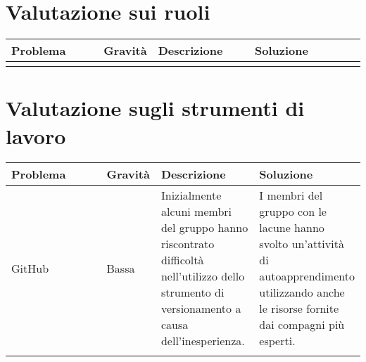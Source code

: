 \section{Valutazione sui ruoli}
\begin{table}[H]
    \centering
    \begin{tabular}{|p{0.27\linewidth}|p{0.11\linewidth}|p{0.29\linewidth}|p{0.33\linewidth}|}
    \hline
    \rowcolor[HTML]{036400}
    {\color[HTML]{FFFFFF} \textbf{Problema}} & {\color[HTML]{FFFFFF} \textbf{Gravità}} & {\color[HTML]{FFFFFF} \textbf{Descrizione}} & {\color[HTML]{FFFFFF} \textbf{Soluzione}} \\ \hline
    \rowcolor[HTML]{EFEFEF}
    &  & & \\ \hline
    \end{tabular}
\end{table}


\section{Valutazione sugli strumenti di lavoro}
    \begin{table}[H]
        \centering
        \begin{tabular}{|p{0.3\linewidth}|p{0.11\linewidth}|p{0.29\linewidth}|p{0.3\linewidth}|}
        \hline
        \rowcolor[HTML]{036400}
        {\color[HTML]{FFFFFF} \textbf{Problema}} & {\color[HTML]{FFFFFF} \textbf{Gravità}} & {\color[HTML]{FFFFFF} \textbf{Descrizione}} & {\color[HTML]{FFFFFF} \textbf{Soluzione}} \\ \hline
        \rowcolor[HTML]{EFEFEF}
        GitHub& Bassa & Inizialmente alcuni membri del gruppo hanno riscontrato difficoltà nell'utilizzo dello strumento di versionamento a causa dell'inesperienza. & I membri del gruppo con le lacune hanno svolto un'attività di autoapprendimento utilizzando anche le risorse fornite dai compagni più esperti. \\ \hline
        \rowcolor[HTML]{C0C0C0}
        \end{tabular}
    \end{table}
